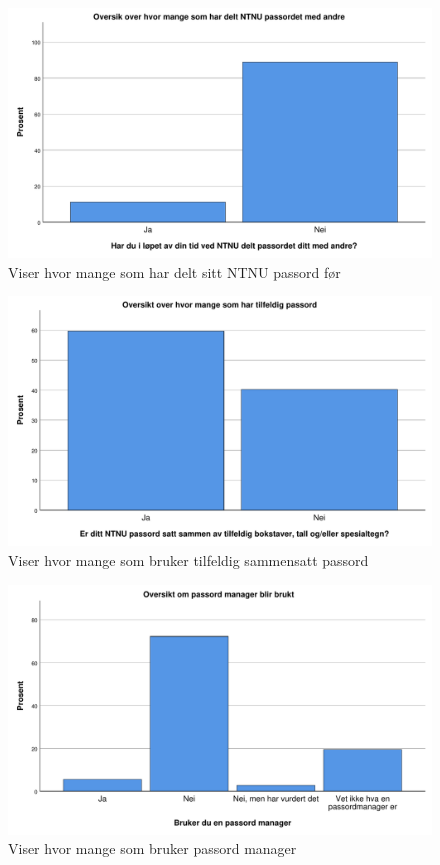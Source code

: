 \begin{figure}[H]
    \centering
    \includegraphics[scale=0.5]{case_2/bilder/spss/passord_deling.pdf}
    \caption[passord-deling]{Viser hvor mange som har delt sitt NTNU passord før}
    \label{fig:passord-deling}
\end{figure}

\begin{figure}[H]
    \centering
    \includegraphics[scale=0.5]{case_2/bilder/spss/tilfeldig_passord.pdf}
    \caption[tilfeldig-passord]{Viser hvor mange som bruker tilfeldig sammensatt passord}
    \label{fig:tilfeldig-passord}
\end{figure}

\begin{figure}[H]
    \centering
    \includegraphics[scale=0.5]{case_2/bilder/spss/pass_manager.pdf}
    \caption[passord-manager]{Viser hvor mange som bruker passord manager}
    \label{fig:passord-manager}
\end{figure}

